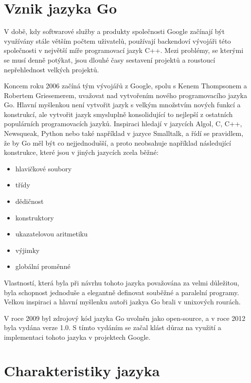 \documentclass[12pt, a4paper]{article}
\let\oldsection\section
\renewcommand\section{\clearpage\oldsection}
\begin{document}
    \tableofcontents
    \pagebreak
    
    \section{Vznik jazyka Go}

 V době, kdy softwarové služby a produkty společnosti Google začínají být využívány stále větším počtem uživatelů, používají backendoví vývojáři této společnosti v největší míře programovací jazyk C++. Mezi problémy, se kterými se musí denně potýkat, jsou dlouhé časy sestavení projektů a roustoucí nepřehlednost velkých projektů.

Koncem roku 2006 začíná tým vývojářů z Google, spolu s Kenem Thompsonem a Robertem Griesemerem, uvažovat nad vytvořením nového programovacího jazyka Go.  Hlavní myšlenkou není vytvořit jazyk s velkým množstvím nových funkcí a konstrukcí, ale vytvořit jazyk smysluplně konsolidující to nejlepší z ostatních populárních programovacích jazyků. Inspiraci hledají v jazycích Algol, C, C++, Newsqueak, Python nebo také například v jazyce Smalltalk, a řídí se pravidlem, že by Go měl být co nejjednodušší, a proto neobsahuje například následující konstrukce, které jsou v jiných jazycích zcela běžné:

\begin{itemize}
    \item hlavičkové soubory
    \item třídy
    \item dědičnost 
    \item konstruktory
    \item ukazatelovou aritmetiku
    \item výjimky
    \item globální proměnné
\end{itemize}

Vlastností, která byla při návrhu tohoto jazyka považována za velmi důležitou, byla schopnost jednoduše a elegantně definovat souběžné a paralelní programy. Velkou inspiraci a hlavní myšlenku autoři jazkya Go brali v unixových rourách.

V roce 2009 byl zdrojový kód jazyka Go uvolněn jako open-source, a v roce 2012 byla vydána verze 1.0. S tímto vydáním se začal klást důraz na využití a implementaci tohoto jazyka v projektech Google.

\section{Charakteristiky jazyka}
\end{document}
